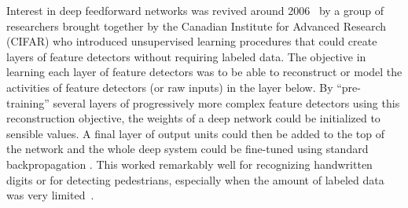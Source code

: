 \documentclass[10pts]{article}
\newcommand{\citep}[1]{\cite{#1}}
\begin{document}

Interest in deep feedforward networks was revived around
2006~\citep{IJCAI,Hinton06-small,Bengio-nips-2006-small,ranzato-07-small}
by a group of researchers brought together by the Canadian Institute
for Advanced Research (CIFAR) who introduced
unsupervised learning procedures that could
create layers of feature detectors without requiring labeled data. The
objective in learning each layer of feature detectors was to be able
to reconstruct or model the activities of feature detectors (or raw
inputs) in the layer below.  By ``pre-training'' several layers of
progressively more complex feature detectors using this reconstruction
objective, the weights of a deep network could be initialized to
sensible values.  A final layer of output units could then be added to
the top of the network and the whole deep system could be fine-tuned
using standard backpropagation
\citep{Hinton-Science2006,Bengio-nips-2006-small,ranzato-07-small}.
This worked remarkably well for recognizing handwritten digits or for
detecting pedestrians, especially when the amount of labeled data was
very limited~\citep{sermanet-cvpr-13}.

\end{document}

